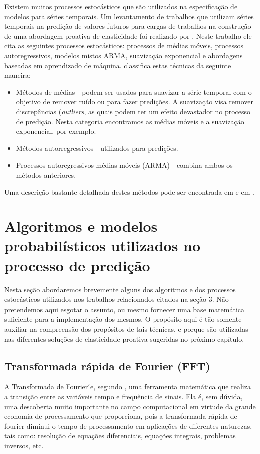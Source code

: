 \documentclass[twoside,english,brazilian]{UNISINOSmonografia}
\begin{document}
Existem muitos processos estocásticos que são utilizados na especificação de modelos para séries temporais. Um levantamento de trabalhos que utilizam séries temporais na predição de valores futuros para cargas de trabalhos na construção de uma abordagem proativa de elasticidade foi realizado por \citep{Lorido-botr2012}. Neste trabalho ele cita as seguintes processos estocásticos: processos de médias móveis, processos autoregressivos, modelos mistos ARMA, suavização exponencial e abordagens baseadas em aprendizado de máquina.\citep{Lorido-botr2012} classifica estas técnicas da seguinte maneira:

\begin{itemize}
	\item Métodos de médias - podem ser usados para suavizar a série temporal com o objetivo de remover ruído ou para fazer predições. A suavização visa remover discrepâncias (\textit{outliers}, as quais podem ter um efeito devastador no processo de predição. Nesta categoria encontramos as médias móveis e a suavização exponencial, por exemplo.
	\item Métodos autorregressivos - utilizados para predições. %
	\item Processos autoregressivos médias móveis (ARMA) - combina ambos os métodos anteriores.
\end{itemize}
Uma descrição bastante detalhada destes métodos pode ser encontrada em \cite{Lee2009} e em \cite{Shumway2000}.

\section{Algoritmos e modelos probabilísticos utilizados no processo de predição}
Nesta seção abordaremos brevemente alguns dos algoritmos e dos processos estocásticos utilizados nos trabalhos relacionados citados na seção 3. Não pretendemos aqui esgotar o assunto, ou mesmo fornecer uma base matemática suficiente para a implementação dos mesmos. O propósito aqui é tão somente auxiliar na compreensão dos propósitos de tais técnicas, e porque são utilizadas nas diferentes soluções de elasticidade proativa sugeridas no próximo capítulo.

\subsection{Transformada rápida de Fourier (FFT)}
A Transformada de Fourier ́e, segundo \cite{Goncalves2004}, uma ferramenta matemática que realiza a transição entre as variáveis tempo e frequência de sinais. Ela é, sem dúvida, uma descoberta muito importante no campo computacional em virtude da grande economia de processamento que proporciona, pois a transformada rápida de fourier diminui o tempo de processamento em aplicações de diferentes naturezas, tais como:  resolução de equações diferenciais, equações integrais, problemas inversos, etc.
\end{document}
